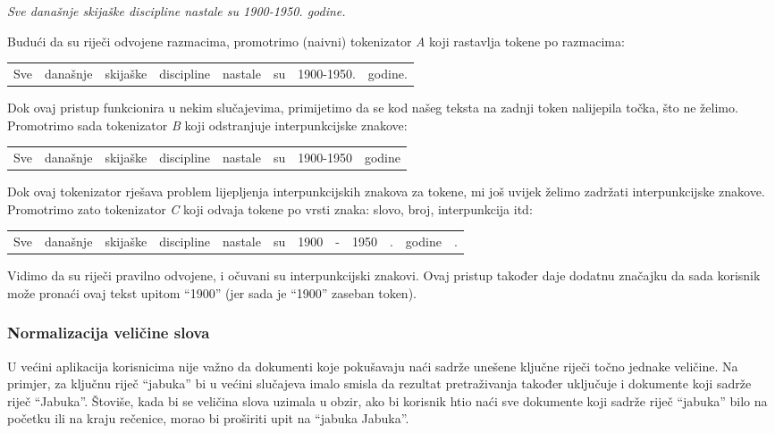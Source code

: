 \documentclass[a4paper,twoside,12pt]{scrreprt}
\newenvironment{nscenter}
 {\par\nopagebreak\centering}
 {\parskip=0pt\par\noindent\ignorespacesafterend}
\begin{document}
\begin{quoting}
  \textit{Sve današnje skijaške discipline nastale su 1900-1950. godine.}
\end{quoting}

Budući da su riječi odvojene razmacima, promotrimo (naivni) tokenizator \textit{A} koji rastavlja tokene po razmacima:

\begin{nscenter}
  \begin{tabular}{|c|c|c|c|c|c|c|c|}
    Sve & današnje & skijaške & discipline & nastale & su & 1900-1950. & godine.
  \end{tabular}
\end{nscenter}

Dok ovaj pristup funkcionira u nekim slučajevima, primijetimo da se kod našeg teksta na zadnji token nalijepila točka, što ne želimo. Promotrimo sada tokenizator \textit{B} koji odstranjuje interpunkcijske znakove:

\begin{nscenter}
  \begin{tabular}{|c|c|c|c|c|c|c|c|}
    Sve & današnje & skijaške & discipline & nastale & su & 1900-1950 & godine
  \end{tabular}
\end{nscenter}

Dok ovaj tokenizator rješava problem lijepljenja interpunkcijskih znakova za tokene, mi još uvijek želimo zadržati interpunkcijske znakove. Promotrimo zato tokenizator \textit{C} koji odvaja tokene po vrsti znaka: slovo, broj, interpunkcija itd:

\begin{nscenter}
  \begin{tabular}{|c|c|c|c|c|c|c|c|c|c|c|c|}
    Sve & današnje & skijaške & discipline & nastale & su & 1900 & - & 1950 & . & godine & .
  \end{tabular}
\end{nscenter}

Vidimo da su riječi pravilno odvojene, i očuvani su interpunkcijski znakovi. Ovaj pristup također daje dodatnu značajku da sada korisnik može pronaći ovaj tekst upitom ``1900'' (jer sada je ``1900'' zaseban token).

\subsubsection{Normalizacija veličine slova}

U većini aplikacija korisnicima nije važno da dokumenti koje pokušavaju naći sadrže unešene ključne riječi točno jednake veličine. Na primjer, za ključnu riječ ``jabuka'' bi u većini slučajeva imalo smisla da rezultat pretraživanja također uključuje i dokumente koji sadrže riječ ``Jabuka''. Štoviše, kada bi se veličina slova uzimala u obzir, ako bi korisnik htio naći sve dokumente koji sadrže riječ ``jabuka'' bilo na početku ili na kraju rečenice, morao bi proširiti upit na ``jabuka Jabuka''.
\end{document}
